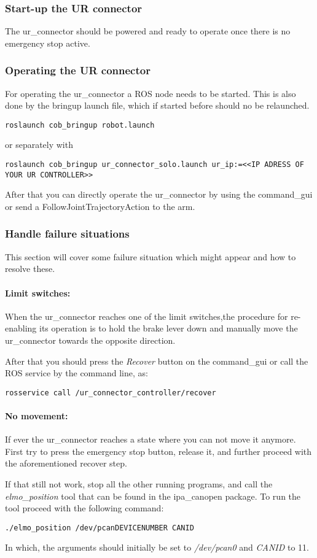 \documentclass[12pt,twoside]{report}
\begin{document}
\subsubsection{Start-up the UR connector}
The ur\_connector should be powered and ready to operate once there is no emergency stop active.

\subsubsection{Operating the UR connector}
For operating the ur\_connector a ROS node needs to be started. This is also done by the bringup launch file, which if started before should no be relaunched.
\begin{lstlisting}
roslaunch cob_bringup robot.launch
\end{lstlisting}
or separately with 
\begin{lstlisting}
roslaunch cob_bringup ur_connector_solo.launch ur_ip:=<<IP ADRESS OF YOUR UR CONTROLLER>>
\end{lstlisting}
After that you can directly operate the ur\_connector by using the command\_gui or send a FollowJointTrajectoryAction to the arm.


\subsubsection{Handle failure situations}
This section will cover some failure situation which might appear and how to resolve these.

\paragraph{Limit switches:}
When the ur\_connector reaches one of the limit switches,the procedure for re-enabling its operation is to hold the brake lever down and manually move the ur\_connector towards the opposite direction.

After that you should press the \emph{Recover} button on the command\_gui or call the ROS service by the command line, as:

\begin{lstlisting}
rosservice call /ur_connector_controller/recover
\end{lstlisting}

\paragraph{No movement:}
If ever the ur\_connector reaches a state where you can not move it anymore. First try to press the emergency stop button, release it, and further proceed with the aforementioned recover step.

If that still not work, stop all the other running programs, and call the \emph{elmo\_position} tool that can be found in the ipa\_canopen package. To run the tool proceed with the following command:

\begin{lstlisting}
./elmo_position /dev/pcanDEVICENUMBER CANID
\end{lstlisting}

In which, the arguments should initially be set to \emph{/dev/pcan0} and \emph{CANID} to 11.
\end{document}

